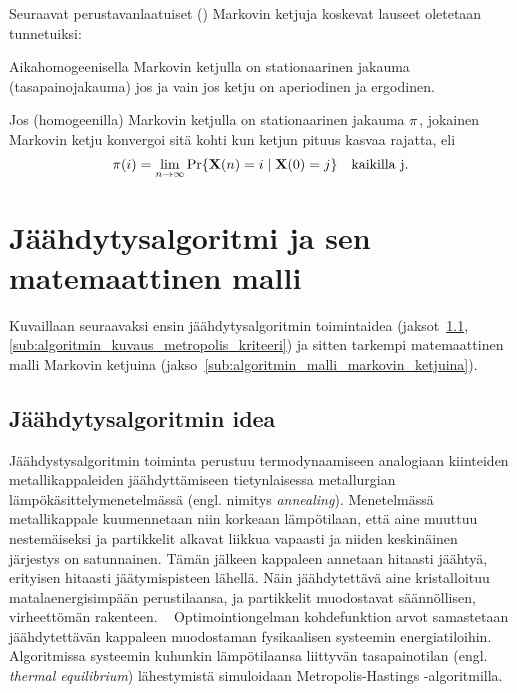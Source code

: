 Seuraavat perustavanlaatuiset (\cite{laarhoven, salamonetal}) Markovin ketjuja koskevat lauseet oletetaan tunnetuiksi:
\begin{lause}
    \label{lause:ketjun_stat_jakauma}
    Aikahomogeenisella Markovin ketjulla on stationaarinen jakauma (tasapainojakauma) jos ja vain jos ketju on aperiodinen ja ergodinen.
\end{lause}
\begin{lause}
    \label{lause:stat_jakauman_konvergenssi}
    Jos (homogeenilla) Markovin ketjulla on stationaarinen jakauma $\mathbf{\pi}$, jokainen Markovin ketju konvergoi sitä kohti kun ketjun pituus kasvaa rajatta, eli
    \begin{equation}
        \mathbf{\pi}(i) = \lim_{n \to \infty} \Pr\{\mathbf{X}(n) = i \mid \mathbf{X}(0) = j\} \quad \text{kaikilla j}.
    \end{equation}
\end{lause}

\section{Jäähdytysalgoritmi ja sen matemaattinen malli}
\label{sec:algoritmin_matemaattinen_malli}

Kuvaillaan seuraavaksi ensin jäähdytysalgoritmin toimintaidea (jaksot~\ref{sub:jaahdytysalgoritmin_idea}, \ref{sub:algoritmin_kuvaus_metropolis_kriteeri})
ja sitten tarkempi matemaattinen malli Markovin ketjuina (jakso~\ref{sub:algoritmin_malli_markovin_ketjuina}).

\subsection{Jäähdytysalgoritmin idea}
\label{sub:jaahdytysalgoritmin_idea}

Jäähdystysalgoritmin toiminta perustuu termodynaamiseen analogiaan kiinteiden metallikappaleiden jäähdyttämiseen tietynlaisessa metallurgian lämpökäsittelymenetelmässä (engl. nimitys \emph{annealing}).
Menetelmässä metallikappale kuumennetaan niin korkeaan lämpötilaan, että aine muuttuu nestemäiseksi ja partikkelit alkavat liikkua vapaasti ja niiden keskinäinen järjestys on satunnainen.
Tämän jälkeen kappaleen annetaan hitaasti jäähtyä, erityisen hitaasti jäätymispisteen lähellä.
Näin jäähdytettävä aine kristalloituu matalaenergisimpään perustilaansa,
ja partikkelit muodostavat säännöllisen, virheettömän rakenteen.
~\cite{kirkpatrick83, laarhoven}
Optimointiongelman kohdefunktion arvot samastetaan jäähdytettävän kappaleen muodostaman fysikaalisen systeemin energiatiloihin.
Algoritmissa systeemin kuhunkin lämpötilaansa liittyvän tasapainotilan (engl. \emph{thermal equilibrium}) lähestymistä simuloidaan Metropolis-Hastings -algoritmilla.
~\cite{kirkpatrick83, salamonetal}

